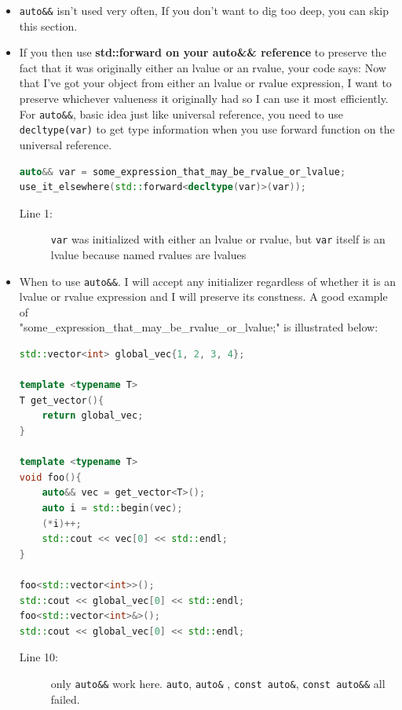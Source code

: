 \documentclass[a4paper,11pt,twoside]{book}
\begin{document}
\begin{itemize}
	
	\item \texttt{auto\&\&} isn't used very often, If you don't want to dig too deep, you can skip this section.
	
	
	\item If you then use \textbf{std::forward on your auto\&\& reference} to preserve the fact that it was originally either an lvalue or an rvalue, your code says: Now that I've got your object from either an lvalue or rvalue expression, I want to preserve whichever valueness it originally had so I can use it most efficiently.  For \texttt{auto\&\&}, basic idea just like universal reference, you need to use \texttt{decltype(var)} to get type information when you use forward function on the universal reference. 
\begin{lstlisting}[frame=single, language=c++]
auto&& var = some_expression_that_may_be_rvalue_or_lvalue;
use_it_elsewhere(std::forward<decltype(var)>(var));
\end{lstlisting}
	\begin{description}
		\item[Line 1:] \texttt{var} was initialized with either an lvalue or rvalue, but \texttt{var} itself is an lvalue because named rvalues are lvalues
	\end{description}
	
	\item When to use \texttt{auto\&\&}. I will accept any initializer regardless of whether it is an lvalue or rvalue expression and I will preserve its constness. A good example of \\ "some\_expression\_that\_may\_be\_rvalue\_or\_lvalue;" is illustrated below:
\begin{lstlisting}[frame=single, language=c++]
std::vector<int> global_vec{1, 2, 3, 4};
		
template <typename T>
T get_vector(){
	return global_vec;
}
		
template <typename T>
void foo(){
	auto&& vec = get_vector<T>(); 
	auto i = std::begin(vec);
	(*i)++;
	std::cout << vec[0] << std::endl;
}
		
foo<std::vector<int>>();
std::cout << global_vec[0] << std::endl;
foo<std::vector<int>&>();
std::cout << global_vec[0] << std::endl;
\end{lstlisting}

	\begin{description}
		\item[Line 10:] only \texttt{auto\&\&} work here. \texttt{auto}, \texttt{auto\&} , \texttt{const auto\&}, \texttt{const auto\&\&} all failed.
	\end{description}
	
\end{itemize}
\end{document}
